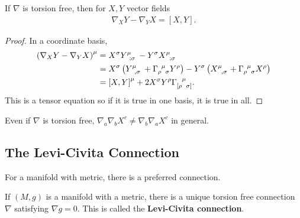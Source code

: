 \begin{lemma}
    If $\nabla$ is torsion free, then for $X,Y$ vector fields
    \begin{align}
        \nabla_X Y - \nabla_Y X = \left[ X, Y \right] 
    .\end{align}
\end{lemma}

\begin{proof}
    In a coordinate basis,
    \begin{align}
        \left( \nabla_X Y - \nabla_Y X \right)^{\mu} &= X^{\sigma} \tensor{Y}{^{\mu}_{;\sigma}} - Y^{\sigma} \tensor{X}{^{\mu}_{;\sigma}} \\
        &= X^{\sigma} \left( \tensor{Y}{^{\mu}_{,\sigma}} + \tensor{\Gamma}{_{\rho}^{\mu}_{\sigma}} Y^{\rho} \right) - Y^{\sigma} \left( \tensor{X}{^{\mu}_{,\sigma}} + \tensor{\Gamma}{_{\rho}^{\mu}_{\sigma}}X^{\rho} \right)    \\
        &= \left[ X, Y \right]^{\mu} + 2 X^{\sigma} Y^{\rho} \tensor{\Gamma}{_{[\rho}^{\mu}_{\sigma]}}
    .\end{align}
    This is a tensor equation so if it is true in one basis, it is true in all.
\end{proof}

\begin{note}
    Even if $\nabla$ is torsion free, $\nabla_a \nabla_b X^{c} \neq \nabla_b \nabla_a X^{c}$ in general.
\end{note}

\subsection{The Levi-Civita Connection}

For a manifold with metric, there is a preferred connection.

\begin{theorem}

    If $\left( M,g \right) $ is a manifold with a metric, there is a unique torsion free connection $\nabla$ satisfying $\nabla g = 0$. This is called the \textbf{Levi-Civita connection}.
\end{theorem}

